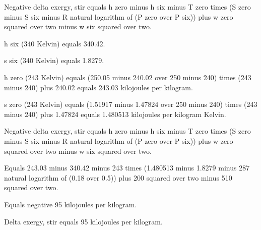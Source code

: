 Negative delta exergy, stir equals h zero minus h six minus T zero times (S zero minus S six minus R natural logarithm of (P zero over P six)) plus w zero squared over two minus w six squared over two.

h six (340 Kelvin) equals 340.42.

s six (340 Kelvin) equals 1.8279.

h zero (243 Kelvin) equals (250.05 minus 240.02 over 250 minus 240) times (243 minus 240) plus 240.02 equals 243.03 kilojoules per kilogram.

s zero (243 Kelvin) equals (1.51917 minus 1.47824 over 250 minus 240) times (243 minus 240) plus 1.47824 equals 1.480513 kilojoules per kilogram Kelvin.

Negative delta exergy, stir equals h zero minus h six minus T zero times (S zero minus S six minus R natural logarithm of (P zero over P six)) plus w zero squared over two minus w six squared over two.

Equals 243.03 minus 340.42 minus 243 times (1.480513 minus 1.8279 minus 287 natural logarithm of (0.18 over 0.5)) plus 200 squared over two minus 510 squared over two.

Equals negative 95 kilojoules per kilogram.

Delta exergy, stir equals 95 kilojoules per kilogram.